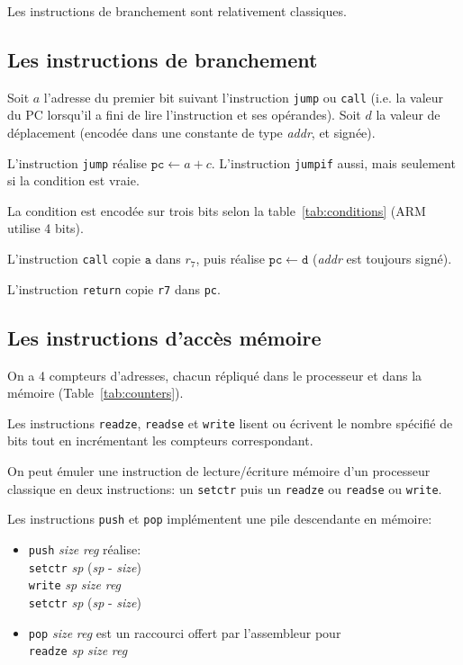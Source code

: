 \documentclass[architecture]{compas2018}
\begin{document}
%
\iffalse
Les instructions de branchement sont relativement classiques.
\subsection{Les instructions de branchement }
\label{sec:jumpcallret}

Soit $a$ l'adresse du premier bit suivant l'instruction \texttt{jump} ou \texttt{call} (i.e. la valeur du PC lorsqu'il a fini de lire l'instruction et ses opérandes).
Soit $d$ la valeur de déplacement (encodée dans une constante de type \textit{addr}, et signée).

L'instruction \texttt{jump} réalise $\mathtt{pc}\leftarrow a + c$.
L'instruction \texttt{jumpif} aussi, mais seulement si la condition est vraie.

La condition  est encodée sur trois bits  selon la table~\ref{tab:conditions} (ARM utilise 4 bits).

L'instruction \texttt{call} copie $\texttt{a}$ dans $r_{7}$, puis réalise $\mathtt{pc} \leftarrow \texttt{d}$
(\emph{addr} est toujours signé).

L'instruction \texttt{return} copie \texttt{r7} dans \texttt{pc}.


\subsection{Les instructions d'accès mémoire}
\label{sec:mem}



On a 4 compteurs d'adresses, chacun  répliqué dans le processeur et dans la mémoire (Table~\ref{tab:counters}).


Les instructions \texttt{readze}, \texttt{readse} et \texttt{write} lisent ou écrivent le nombre spécifié de bits tout en incrémentant les compteurs correspondant.

On peut émuler une instruction de lecture/écriture mémoire d'un processeur classique en deux instructions: un \texttt{setctr} puis un \texttt{readze} ou \texttt{readse} ou \texttt{write}.

Les instructions \texttt{push} et \texttt{pop} implémentent une pile descendante en mémoire: 
\begin{itemize}
\item \texttt{push} \emph{size} \emph{reg} réalise: \\
   \texttt{setctr} \textit{sp} (\textit{sp} - \textit{size})\\ \texttt{write}  \textit{sp} \textit{size} \textit{reg} \\ \texttt{setctr} \textit{sp} (\textit{sp} - \textit{size})
\item \texttt{pop} \emph{size} \emph{reg} est un raccourci offert par l'assembleur pour \\\texttt{readze} \textit{sp} \emph{size} \emph{reg}\\
  
\end{itemize}
\end{document}

